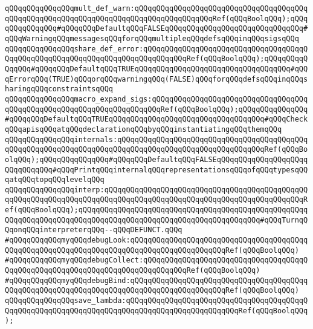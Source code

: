 \verb|qQQqqQQqqQQqqQQqmult_def_warn:qQQqqQQqqQQqqQQqqQQqqQQqqQQqqQQqqQQqqQQqqQQqqQQqqQQqqQQqqQQqqQQqqQQqqQQqqQQqqQQqqQQqqQQqRef(qQQqBoolqQQq);qQQqqQQqqQQqqQQq#qQQqqQQqDefaultqQQqFALSEqQQqqQQqqQQqqQQqqQQqqQQqqQQqqQQq#qQQqWarningqQQqmessagesqQQqforqQQqmultipleqQQqdefsqQQqinqQQqsigsqQQq|\newline
\verb|qQQqqQQqqQQqqQQqshare_def_error:qQQqqQQqqQQqqQQqqQQqqQQqqQQqqQQqqQQqqQQqqQQqqQQqqQQqqQQqqQQqqQQqqQQqqQQqqQQqqQQqRef(qQQqBoolqQQq);qQQqqQQqqQQqqQQq#qQQqqQQqDefaultqQQqTRUEqQQqqQQqqQQqqQQqqQQqqQQqqQQqqQQqqQQq#qQQqErrorqQQq(TRUE)qQQqorqQQqwarningqQQq(FALSE)qQQqforqQQqdefsqQQqinqQQqsharingqQQqconstraintsqQQq|\newline
\verb|qQQqqQQqqQQqqQQqmacro_expand_sigs:qQQqqQQqqQQqqQQqqQQqqQQqqQQqqQQqqQQqqQQqqQQqqQQqqQQqqQQqqQQqqQQqqQQqqQQqRef(qQQqBoolqQQq);qQQqqQQqqQQqqQQq#qQQqqQQqDefaultqQQqTRUEqQQqqQQqqQQqqQQqqQQqqQQqqQQqqQQqqQQq#qQQqCheckqQQqapisqQQqatqQQqdeclarationqQQqbyqQQqinstantiatingqQQqthemqQQq|\newline
\verb|qQQqqQQqqQQqqQQqinternals:qQQqqQQqqQQqqQQqqQQqqQQqqQQqqQQqqQQqqQQqqQQqqQQqqQQqqQQqqQQqqQQqqQQqqQQqqQQqqQQqqQQqqQQqqQQqqQQqqQQqqQQqRef(qQQqBoolqQQq);qQQqqQQqqQQqqQQq#qQQqqQQqDefaultqQQqFALSEqQQqqQQqqQQqqQQqqQQqqQQqqQQqqQQq#qQQqPrintqQQqinternalqQQqrepresentationsqQQqofqQQqtypesqQQqatqQQqtopqQQqlevelqQQq|\newline
\verb|qQQqqQQqqQQqqQQqinterp:qQQqqQQqqQQqqQQqqQQqqQQqqQQqqQQqqQQqqQQqqQQqqQQqqQQqqQQqqQQqqQQqqQQqqQQqqQQqqQQqqQQqqQQqqQQqqQQqqQQqqQQqqQQqqQQqqQQqRef(qQQqBoolqQQq);qQQqqQQqqQQqqQQqqQQqqQQqqQQqqQQqqQQqqQQqqQQqqQQqqQQqqQQqqQQqqQQqqQQqqQQqqQQqqQQqqQQqqQQqqQQqqQQqqQQqqQQqqQQqqQQq#qQQqTurnqQQqonqQQqinterpreterqQQq--qQQqDEFUNCT.qQQq|\newline
\newline
\verb|#qQQqqQQqqQQqmyqQQqdebugLook:qQQqqQQqqQQqqQQqqQQqqQQqqQQqqQQqqQQqqQQqqQQqqQQqqQQqqQQqqQQqqQQqqQQqqQQqqQQqqQQqqQQqqQQqqQQqRef(qQQqBoolqQQq)|\newline
\verb|#qQQqqQQqqQQqmyqQQqdebugCollect:qQQqqQQqqQQqqQQqqQQqqQQqqQQqqQQqqQQqqQQqqQQqqQQqqQQqqQQqqQQqqQQqqQQqqQQqqQQqqQQqRef(qQQqBoolqQQq)|\newline
\verb|#qQQqqQQqqQQqmyqQQqdebugBind:qQQqqQQqqQQqqQQqqQQqqQQqqQQqqQQqqQQqqQQqqQQqqQQqqQQqqQQqqQQqqQQqqQQqqQQqqQQqqQQqqQQqqQQqqQQqRef(qQQqBoolqQQq)|\newline
\newline
\verb|qQQqqQQqqQQqqQQqsave_lambda:qQQqqQQqqQQqqQQqqQQqqQQqqQQqqQQqqQQqqQQqqQQqqQQqqQQqqQQqqQQqqQQqqQQqqQQqqQQqqQQqqQQqqQQqqQQqqQQqRef(qQQqBoolqQQq);|\newline
